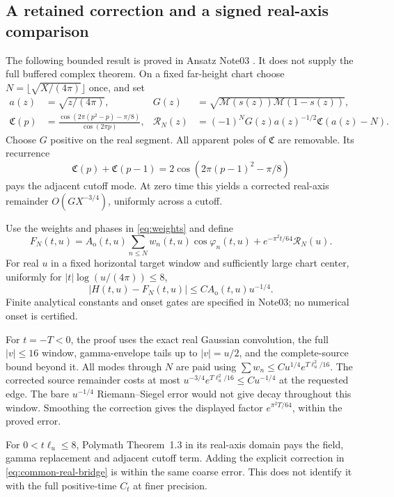 \documentclass[11pt]{article}
\newcommand{\Mc}{\mathcal M}
\numberwithin{equation}{section}
\begin{document}
\subsection{A retained correction and a signed real-axis comparison}
The following bounded result is proved in Ansatz Note03
\cite{ansatz03}. It does not supply the full buffered complex theorem.
On a fixed far-height chart choose
\(N=\lfloor\sqrt{X/(4\pi)}\rfloor\) once, and set
\begin{align}
 a(z)&=\sqrt{z/(4\pi)},&
 G(z)&=\sqrt{\Mc(s(z))\Mc(1-s(z))},\\
 \mathfrak C(p)&=
 \frac{\cos(2\pi(p^2-p)-\pi/8)}{\cos(2\pi p)},&
 \mathcal R_N(z)&=(-1)^NG(z)a(z)^{-1/2}
                           \mathfrak C(a(z)-N).
 \label{eq:fixed-rs-correction}
\end{align}
Choose \(G\) positive on the real segment. All apparent poles of
\(\mathfrak C\) are removable. Its recurrence
\[
 \mathfrak C(p)+\mathfrak C(p-1)
       =2\cos(2\pi(p-1)^2-\pi/8)
\]
pays the adjacent cutoff mode. At zero time this yields a corrected
real-axis remainder \(O(GX^{-3/4})\), uniformly across a cutoff.

Use the weights and phases in \eqref{eq:weights} and define
\begin{equation}
 F_N(t,u)=A_{\mathrm o}(t,u)\sum_{n\le N}w_n(t,u)\cos\varphi_n(t,u)
                    +e^{-\pi^2t/64}\mathcal R_N(u).
 \label{eq:common-real-bridge}
\end{equation}
For real \(u\) in a fixed horizontal target window and sufficiently
large chart center, uniformly for \(|t|\log(u/(4\pi))\le8\),
\begin{equation}
 |H(t,u)-F_N(t,u)|\le C A_{\mathrm o}(t,u)u^{-1/4}.
 \label{eq:real-bridge-bound}
\end{equation}
Finite analytical constants and onset gates are specified in Note03;
no numerical onset is certified.

For \(t=-T<0\), the proof uses the exact real Gaussian convolution,
the full \(|v|\le16\) window, gamma-envelope tails up to
\(|v|=u/2\), and the complete-source bound beyond it. All modes
through \(N\) are paid using
\(\sum w_n\le C u^{1/4}e^{T\ell_u^2/16}\).
The corrected source remainder costs at most
\(u^{-3/4}e^{T\ell_u^2/16}\le C u^{-1/4}\) at the requested edge.
The bare \(u^{-1/4}\) Riemann--Siegel error would not give decay
throughout this window. Smoothing the correction gives the displayed
factor \(e^{\pi^2T/64}\), within the proved error.

For \(0<t\ell_u\le8\), Polymath Theorem~1.3 in its real-axis
domain pays the field, gamma replacement and adjacent cutoff term.
Adding the explicit correction in \eqref{eq:common-real-bridge} is
within the same coarse error. This does not identify it with the full
positive-time \(C_t\) at finer precision.
\end{document}
